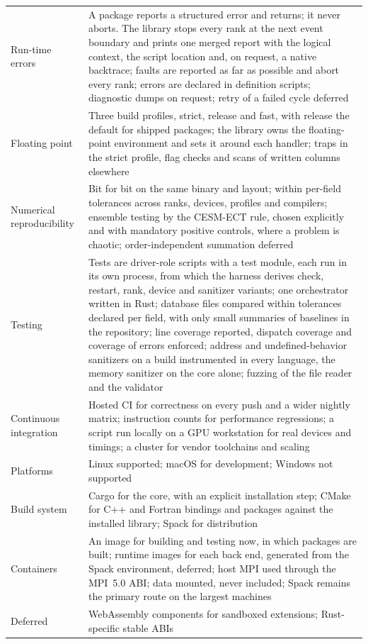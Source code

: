 \documentclass[11pt,a4paper]{article}
\begin{document}
{\begin{xltabular}{\textwidth}{@{}>{\raggedright\arraybackslash}p{32mm} L@{}}
Run-time errors & A package reports a structured error and returns; it never aborts.  The library stops every rank at the next event boundary and prints one merged report with the logical context, the script location and, on request, a native backtrace; faults are reported as far as possible and abort every rank; errors are declared in definition scripts; diagnostic dumps on request; retry of a failed cycle deferred \\
Floating point & Three build profiles, strict, release and fast, with release the default for shipped packages; the library owns the floating-point environment and sets it around each handler; traps in the strict profile, flag checks and scans of written columns elsewhere \\
Numerical reproducibility & Bit for bit on the same binary and layout; within per-field tolerances across ranks, devices, profiles and compilers; ensemble testing by the CESM-ECT rule, chosen explicitly and with mandatory positive controls, where a problem is chaotic; order-independent summation deferred \\
Testing & Tests are driver-role scripts with a test module, each run in its own process, from which the harness derives check, restart, rank, device and sanitizer variants; one orchestrator written in Rust; database files compared within tolerances declared per field, with only small summaries of baselines in the repository; line coverage reported, dispatch coverage and coverage of errors enforced; address and undefined-behavior sanitizers on a build instrumented in every language, the memory sanitizer on the core alone; fuzzing of the file reader and the validator \\
Continuous integration & Hosted CI for correctness on every push and a wider nightly matrix; instruction counts for performance regressions; a script run locally on a GPU workstation for real devices and timings; a cluster for vendor toolchains and scaling \\
Platforms & Linux supported; macOS for development; Windows not supported \\
Build system & Cargo for the core, with an explicit installation step; CMake for C++ and Fortran bindings and packages against the installed library; Spack for distribution \\
Containers & An image for building and testing now, in which packages are built; runtime images for each back end, generated from the Spack environment, deferred; host MPI used through the MPI~5.0 ABI; data mounted, never included; Spack remains the primary route on the largest machines \\
Deferred & WebAssembly components for sandboxed extensions; Rust-specific stable ABIs \\
\end{xltabular}
}

\printbibliography
\end{document}
